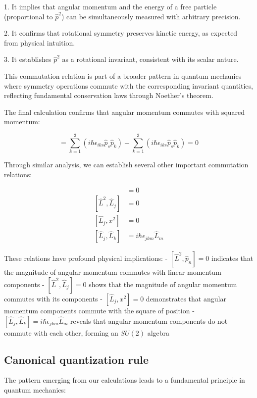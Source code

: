 1. It implies that angular momentum and the energy of a free particle (proportional to $\hat{p}^2$) can be simultaneously measured with arbitrary precision.

2. It confirms that rotational symmetry preserves kinetic energy, as expected from physical intuition.

3. It establishes $\hat{p}^2$ as a rotational invariant, consistent with its scalar nature.

This commutation relation is part of a broader pattern in quantum mechanics where symmetry operations commute with the corresponding invariant quantities, reflecting fundamental conservation laws through Noether's theorem.


The final calculation confirms that angular momentum commutes with squared momentum:

\begin{equation}
[\hat{L}_i, \hat{p}^2] = \sum_{k=1}^{3}(i\hbar\epsilon_{iks}\hat{p}_s\hat{p}_k) - \sum_{k=1}^{3}(i\hbar\epsilon_{iks}\hat{p}_s\hat{p}_k) = 0
\end{equation}

Through similar analysis, we can establish several other important commutation relations:

\begin{align}
[\hat{L}^2, \hat{p}_n] &= 0 \\
[\hat{L}^2, \hat{L}_j] &= 0 \\
[\hat{L}_j, x^2] &= 0  \\
[\hat{L}_j, \hat{L}_k] &= i\hbar\epsilon_{jkm}\hat{L}_m
\end{align}

These relations have profound physical implications:
- $[\hat{L}^2, \hat{p}_n] = 0$ indicates that the magnitude of angular momentum commutes with linear momentum components
- $[\hat{L}^2, \hat{L}_j] = 0$ shows that the magnitude of angular momentum commutes with its components
- $[\hat{L}_j, x^2] = 0$ demonstrates that angular momentum components commute with the square of position
- $[\hat{L}_j, \hat{L}_k] = i\hbar\epsilon_{jkm}\hat{L}_m$ reveals that angular momentum components do not commute with each other, forming an $SU(2)$ algebra

\subsection{Canonical quantization rule}

The pattern emerging from our calculations leads to a fundamental principle in quantum mechanics:

